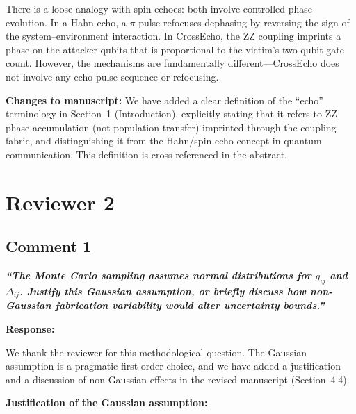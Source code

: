 \documentclass[11pt,a4paper]{article}
\begin{document}
There is a loose analogy with spin echoes: both involve controlled phase evolution. In a
Hahn echo, a $\pi$-pulse refocuses dephasing by reversing the sign of the
system--environment interaction. In CrossEcho, the ZZ coupling imprints a phase on the
attacker qubits that is proportional to the victim's two-qubit gate count. However, the
mechanisms are fundamentally different---CrossEcho does not involve any echo pulse sequence
or refocusing.

\medskip\noindent\textbf{Changes to manuscript:} We have added a clear definition of the
``echo'' terminology in Section~1 (Introduction), explicitly stating that it refers to ZZ
phase accumulation (not population transfer) imprinted through the coupling fabric, and
distinguishing it from the Hahn/spin-echo concept in quantum communication. This definition
is cross-referenced in the abstract.

\section*{Reviewer 2}

\subsection*{Comment 1}

\noindent\textbf{\textit{``The Monte Carlo sampling assumes normal distributions for
$g_{ij}$ and $\Delta_{ij}$. Justify this Gaussian assumption, or briefly discuss how
non-Gaussian fabrication variability would alter uncertainty bounds.''}}

\medskip\noindent\textbf{Response:}

We thank the reviewer for this methodological question. The Gaussian assumption is a
pragmatic first-order choice, and we have added a justification and a discussion of
non-Gaussian effects in the revised manuscript (Section~4.4).

\medskip\noindent\textbf{Justification of the Gaussian assumption:}
\end{document}
